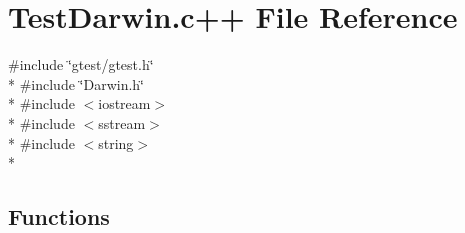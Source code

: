 \hypertarget{TestDarwin_8c_09_09}{\section{Test\-Darwin.\-c++ File Reference}
\label{TestDarwin_8c_09_09}
}
{\ttfamily \#include \char`\"{}gtest/gtest.\-h\char`\"{}}\\*
{\ttfamily \#include \char`\"{}Darwin.\-h\char`\"{}}\\*
{\ttfamily \#include $<$iostream$>$}\\*
{\ttfamily \#include $<$sstream$>$}\\*
{\ttfamily \#include $<$string$>$}\\*
\subsection*{Functions}
